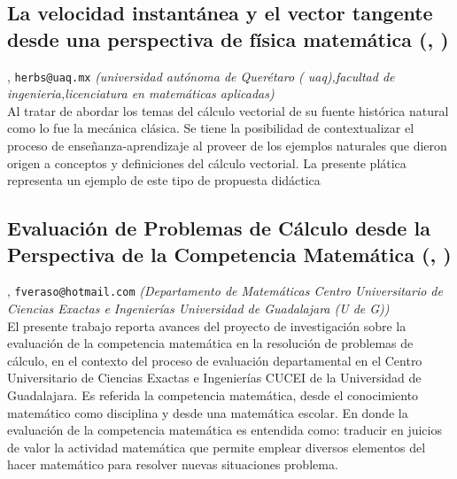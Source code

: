 \subsection{\sffamily La velocidad instantánea y el  vector tangente desde una perspectiva de  física matemática {\footnotesize (, )}} \label{reg-1424} 
, {\tt herbs@uaq.mx}  {\slshape (universidad autónoma de Querétaro ( uaq),facultad de ingenieria,licenciatura en matemáticas aplicadas)}\\
          \noindent Al tratar de abordar los temas del cálculo vectorial de su fuente histórica  natural como lo fue la mecánica clásica. Se tiene la posibilidad  de contextualizar  el proceso de enseñanza-aprendizaje al proveer de los ejemplos  naturales que dieron origen a conceptos y definiciones  del cálculo vectorial. La presente plática representa un ejemplo de este tipo de propuesta didáctica
\subsection{\sffamily Evaluación de Problemas de Cálculo desde la Perspectiva de la Competencia Matemática {\footnotesize (, )}} \label{reg-1220} 
, {\tt fveraso@hotmail.com}  {\slshape (Departamento de Matemáticas Centro Universitario de Ciencias Exactas e Ingenierías Universidad de Guadalajara (U de G))}\\
          \noindent El presente trabajo reporta avances del proyecto de investigación sobre la evaluación de la competencia matemática en la resolución de problemas de cálculo, en el contexto del proceso de evaluación departamental en el Centro Universitario de Ciencias Exactas e Ingenierías CUCEI de la Universidad de Guadalajara. Es referida la competencia matemática, desde el conocimiento matemático como disciplina y desde una matemática escolar. En donde la evaluación de la competencia matemática es entendida como: traducir en juicios de valor la actividad matemática que permite emplear diversos elementos del hacer matemático para resolver nuevas situaciones problema.
